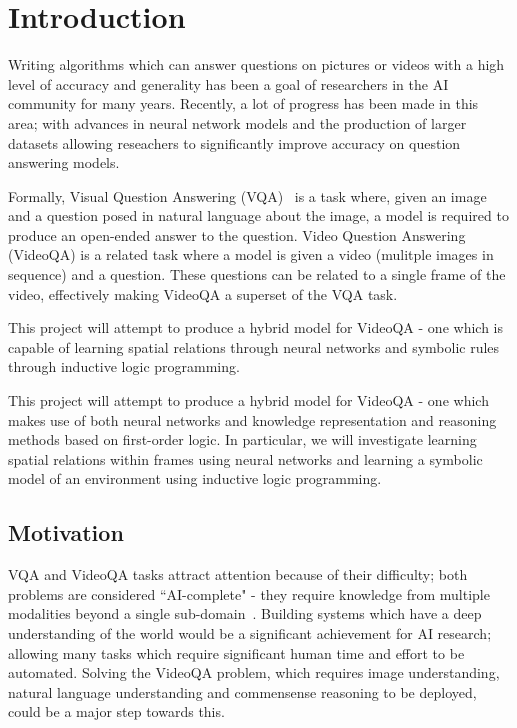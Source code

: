 \documentclass[../interim.tex]{subfiles}
\begin{document}
\chapter{Introduction}
\label{chapter:intro}

Writing algorithms which can answer questions on pictures or videos with a high level of accuracy and generality has been a goal of researchers in the AI community for many years. Recently, a lot of progress has been made in this area; with advances in neural network models and the production of larger datasets allowing reseachers to significantly improve accuracy on question answering models.

Formally, Visual Question Answering (VQA)~\cite{vqa-intro} is a task where, given an image and a question posed in natural language about the image, a model is required to produce an open-ended answer to the question. Video Question Answering (VideoQA) is a related task where a model is given a video (mulitple images in sequence) and a question. These questions can be related to a single frame of the video, effectively making VideoQA a superset of the VQA task.

This project will attempt to produce a hybrid model for VideoQA - one which is capable of learning spatial relations through neural networks and symbolic rules through inductive logic programming.

This project will attempt to produce a hybrid model for VideoQA - one which makes use of both neural networks and knowledge representation and reasoning methods based on first-order logic. In particular, we will investigate learning spatial relations within frames using neural networks and learning a symbolic model of an environment using inductive logic programming.


\section{Motivation}

VQA and VideoQA tasks attract attention because of their difficulty; both problems are considered ``AI-complete" - they require knowledge from multiple modalities beyond a single sub-domain~\cite{def:ai-complete}. Building systems which have a deep understanding of the world would be a significant achievement for AI research; allowing many tasks which require significant human time and effort to be automated. Solving the VideoQA problem, which requires image understanding, natural language understanding and commensense reasoning to be deployed, could be a major step towards this.
\end{document}
